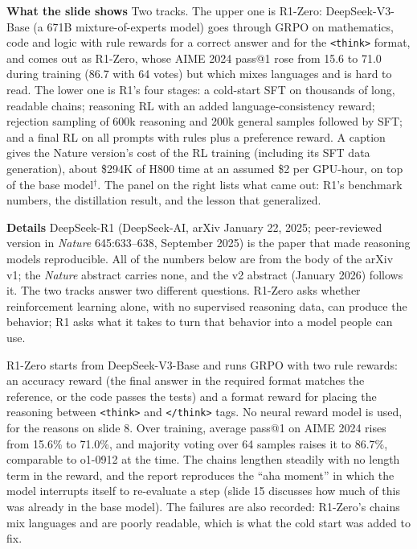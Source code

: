 \documentclass[11pt,letterpaper]{article}
\newcommand{\para}[1]{\medskip\noindent\textbf{#1}\quad}
\begin{document}
\para{What the slide shows} Two tracks. The upper one is R1-Zero: DeepSeek-V3-Base (a 671B mixture-of-experts model) goes through GRPO on mathematics, code and logic with rule rewards for a correct answer and for the \texttt{<think>} format, and comes out as R1-Zero, whose AIME 2024 pass@1 rose from 15.6 to 71.0 during training (86.7 with 64 votes) but which mixes languages and is hard to read. The lower one is R1's four stages: a cold-start SFT on thousands of long, readable chains; reasoning RL with an added language-consistency reward; rejection sampling of 600k reasoning and 200k general samples followed by SFT; and a final RL on all prompts with rules plus a preference reward. A caption gives the Nature version's cost of the RL training (including its SFT data generation), about \$294K of H800 time at an assumed \$2 per GPU-hour, on top of the base model$^\dagger$. The panel on the right lists what came out: R1's benchmark numbers, the distillation result, and the lesson that generalized.

\para{Details} DeepSeek-R1 (DeepSeek-AI, arXiv January 22, 2025; peer-reviewed version in \emph{Nature} 645:633--638, September 2025) is the paper that made reasoning models reproducible. All of the numbers below are from the body of the arXiv v1; the \emph{Nature} abstract carries none, and the v2 abstract (January 2026) follows it. The two tracks answer two different questions. R1-Zero asks whether reinforcement learning alone, with no supervised reasoning data, can produce the behavior; R1 asks what it takes to turn that behavior into a model people can use.

R1-Zero starts from DeepSeek-V3-Base and runs GRPO with two rule rewards: an accuracy reward (the final answer in the required format matches the reference, or the code passes the tests) and a format reward for placing the reasoning between \texttt{<think>} and \texttt{</think>} tags. No neural reward model is used, for the reasons on slide 8. Over training, average pass@1 on AIME 2024 rises from 15.6\% to 71.0\%, and majority voting over 64 samples raises it to 86.7\%, comparable to o1-0912 at the time. The chains lengthen steadily with no length term in the reward, and the report reproduces the ``aha moment'' in which the model interrupts itself to re-evaluate a step (slide 15 discusses how much of this was already in the base model). The failures are also recorded: R1-Zero's chains mix languages and are poorly readable, which is what the cold start was added to fix.
\end{document}

